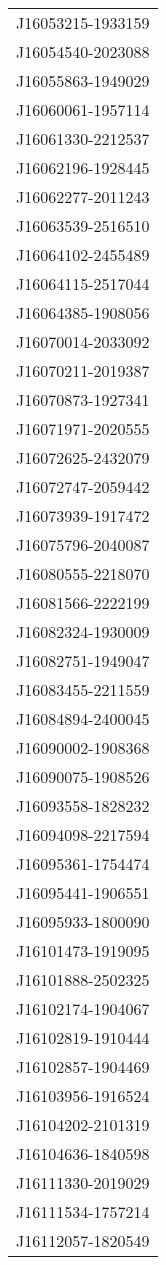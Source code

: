 \begin{longtable}{l}
J16053215-1933159 \\
J16054540-2023088 \\
J16055863-1949029 \\
J16060061-1957114 \\
J16061330-2212537 \\
J16062196-1928445 \\
J16062277-2011243 \\
J16063539-2516510 \\
J16064102-2455489 \\
J16064115-2517044 \\
J16064385-1908056 \\
J16070014-2033092 \\
J16070211-2019387 \\
J16070873-1927341 \\
J16071971-2020555 \\
J16072625-2432079 \\
J16072747-2059442 \\
J16073939-1917472 \\
J16075796-2040087 \\
J16080555-2218070 \\
J16081566-2222199 \\
J16082324-1930009 \\
J16082751-1949047 \\
J16083455-2211559 \\
J16084894-2400045 \\
J16090002-1908368 \\
J16090075-1908526 \\
J16093558-1828232 \\
J16094098-2217594 \\
J16095361-1754474 \\
J16095441-1906551 \\
J16095933-1800090 \\
J16101473-1919095 \\
J16101888-2502325 \\
J16102174-1904067 \\
J16102819-1910444 \\
J16102857-1904469 \\
J16103956-1916524 \\
J16104202-2101319 \\
J16104636-1840598 \\
J16111330-2019029 \\
J16111534-1757214 \\
J16112057-1820549 \\

\end{longtable}
